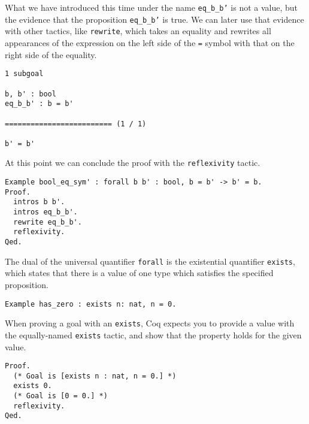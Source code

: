What we have introduced this time under the name \texttt{eq_b_b'} is not a value, but the
evidence that the proposition \texttt{eq_b_b'} is true. We can later use that evidence with
other tactics, like \texttt{rewrite}, which takes an equality and rewrites all appearances of
the expression on the left side of the \texttt{=} symbol with that on the right side of the 
equality.

\begin{verbatim}
1 subgoal

b, b' : bool
eq_b_b' : b = b'

========================= (1 / 1)

b' = b'
\end{verbatim}

At this point we can conclude the proof with the \texttt{reflexivity} tactic.

\begin{verbatim}
Example bool_eq_sym' : forall b b' : bool, b = b' -> b' = b.
Proof.
  intros b b'.
  intros eq_b_b'.
  rewrite eq_b_b'.
  reflexivity.
Qed.
\end{verbatim}

The dual of the universal quantifier \texttt{forall} is the existential quantifier
\texttt{exists}, which states that there is a value of one type which satisfies the specified
proposition.

\begin{verbatim}
Example has_zero : exists n: nat, n = 0.
\end{verbatim}

When proving a goal with an \texttt{exists}, Coq expects you to provide a value with the 
equally-named \texttt{exists} tactic, and show that the property holds for the given value.

\begin{verbatim}
Proof.
  (* Goal is [exists n : nat, n = 0.] *)
  exists 0. 
  (* Goal is [0 = 0.] *)
  reflexivity.
Qed.
\end{verbatim}


